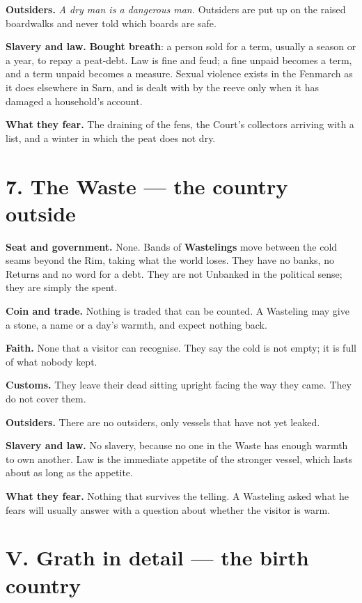 \documentclass{design/chronicle}
\begin{document}
\textbf{Outsiders.} \emph{A dry man is a dangerous man.} Outsiders are put up on the raised boardwalks and never told which boards are safe.

\textbf{Slavery and law.} \textbf{Bought breath}: a person sold for a term, usually a season or a year, to repay a peat-debt. Law is fine and feud; a fine unpaid becomes a term, and a term unpaid becomes a measure. Sexual violence exists in the Fenmarch as it does elsewhere in Sarn, and is dealt with by the reeve only when it has damaged a household’s account.

\textbf{What they fear.} The draining of the fens, the Court’s collectors arriving with a list, and a winter in which the peat does not dry.

\section*{7. The Waste — the country outside}

\textbf{Seat and government.} None. Bands of \textbf{Wastelings} move between the cold seams beyond the Rim, taking what the world loses. They have no banks, no Returns and no word for a debt. They are not Unbanked in the political sense; they are simply the spent.

\textbf{Coin and trade.} Nothing is traded that can be counted. A Wasteling may give a stone, a name or a day’s warmth, and expect nothing back.

\textbf{Faith.} None that a visitor can recognise. They say the cold is not empty; it is full of what nobody kept.

\textbf{Customs.} They leave their dead sitting upright facing the way they came. They do not cover them.

\textbf{Outsiders.} There are no outsiders, only vessels that have not yet leaked.

\textbf{Slavery and law.} No slavery, because no one in the Waste has enough warmth to own another. Law is the immediate appetite of the stronger vessel, which lasts about as long as the appetite.

\textbf{What they fear.} Nothing that survives the telling. A Wasteling asked what he fears will usually answer with a question about whether the visitor is warm.

\CRrule

\section*{V. Grath in detail — the birth country}
\end{document}
